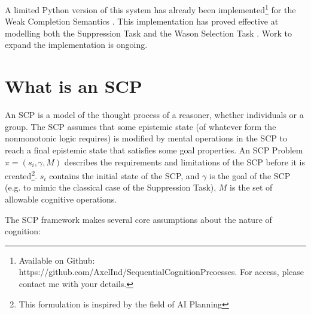 \documentclass{article}
\begin{document}
A limited Python version of this system has already been implemented\footnote{Available on Github: https://github.com/AxelInd/SequentialCognitionPrcoesses. For access, please contact me with your details.} for the Weak Completion Semantics \citep{holldobler2015weak}. This implementation has proved effective at modelling both the Suppression Task \citep{byrne1989suppressing} and the Wason Selection Task \citep{wason1968reasoning}. Work to expand the implementation is ongoing.

\section{What is an SCP}

An SCP is a model of the thought process of a reasoner, whether individuals or a group. The SCP assumes that some epistemic state (of whatever form the nonmonotonic logic requires) is modified by mental operations in the SCP to reach a final epistemic state that satisfies some goal properties. An SCP Problem $\pi=(s_i,\gamma,M)$ describes the requirements and limitations of the SCP before it is created\footnote{This formulation is inspired by the field of AI Planning}. $s_i$ contains the initial state of the SCP, and $\gamma$ is the goal of the SCP (e.g. to mimic the classical case of the Suppression Task), $M$ is the set of allowable cognitive operations.

The SCP framework makes several core assumptions about the nature of cognition:
\end{document}
